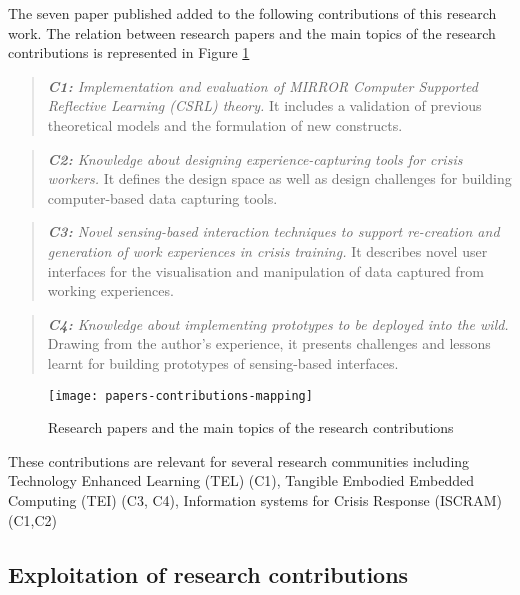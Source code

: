 The seven paper published added to the following contributions of this research work. The relation between research papers and the main topics of the research contributions is represented in Figure \ref{fig:mapping}
\begin{quote}
	\emph{\textbf{C1:} Implementation and evaluation of MIRROR Computer Supported Reflective Learning (CSRL) theory.} It includes a validation of previous theoretical models and the formulation of new constructs. 
\end{quote}
\begin{quote}
	\emph{\textbf{C2:} Knowledge about designing experience-capturing tools for crisis workers.} It defines the design space as well as design challenges for building computer-based data capturing tools. 
\end{quote}
\begin{quote}
	\emph{\textbf{C3:} Novel sensing-based interaction techniques to support re-creation and generation of work experiences in crisis training.} It describes novel user interfaces for the visualisation and manipulation of data captured from working experiences. 
\end{quote}
\begin{quote}
	\emph{\textbf{C4:} Knowledge about implementing prototypes to be deployed into the wild.} Drawing from the author's experience, it presents challenges and lessons learnt for building prototypes of sensing-based interfaces. 
\end{quote}
\begin{figure}
	[tb] \centering 
	\texttt{[image: papers-contributions-mapping]} \caption{Research papers and the main topics of the research contributions} \label{fig:mapping} 
\end{figure}

These contributions are relevant for several research communities including Technology Enhanced Learning (TEL) (C1), Tangible Embodied Embedded Computing (TEI) (C3, C4), Information systems for Crisis Response (ISCRAM) (C1,C2)

\subsection{Exploitation of research contributions}\label{exploitation-of-research-contributions}

